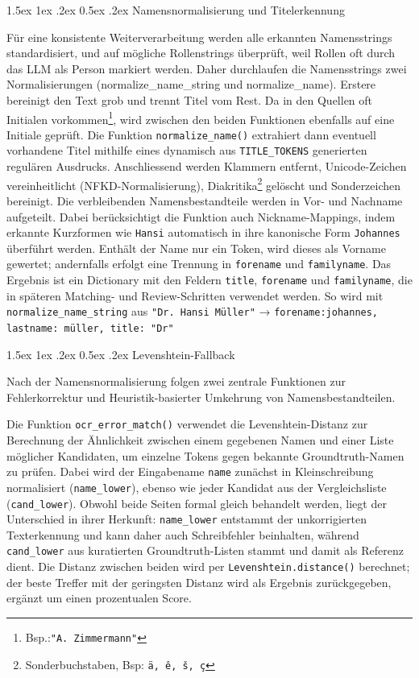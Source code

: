 \documentclass[12pt, a4paper, ngerman, bidi=default]{article}
\makeatletter
\newcommand{\code}[1]{\colorbox{VeryLightGray}{\texttt{#1}}} %
\let\oldparagraph\paragraph%
\renewcommand{\paragraph}{
    \@ifstar%
      \xxxParagraphStar%
      \xxxParagraphNoStar%
 }
\newcommand{\xxxParagraphStar}[1]{\oldparagraph*{#1}\mbox{}}
\newcommand{\xxxParagraphNoStar}[1]{\oldparagraph{#1}\mbox{}}
\renewcommand\paragraph{\@startsection{paragraph}{4}{0em}%
  {1.5ex \@plus1ex \@minus.2ex}%
  {0.5ex \@plus.2ex}%
  {\normalfont\normalsize\bfseries\itshape}}
\makeatother
\begin{document}
\paragraph{Namensnormalisierung und Titelerkennung}\label{paragraph:Pers_match/Normalisierung}

Für eine konsistente Weiterverarbeitung werden alle erkannten Namensstrings standardisiert, und auf mögliche Rollenstrings überprüft, weil Rollen oft durch das LLM als Person markiert werden. Daher durchlaufen die Namensstrings zwei Normalisierungen (normalize\_name\_string und normalize\_name). Erstere bereinigt den Text grob und trennt Titel vom Rest. Da in den Quellen oft Initialen vorkommen\footnote{Bsp.:\texttt{"A. Zimmermann"}}, wird zwischen den beiden Funktionen ebenfalls auf eine Initiale geprüft.
Die Funktion \code{normalize\_name()} extrahiert dann eventuell vorhandene Titel mithilfe eines dynamisch aus \code{TITLE\_TOKENS} generierten regulären Ausdrucks. Anschliessend werden Klammern entfernt, Unicode-Zeichen vereinheitlicht (NFKD-Normalisierung), Diakritika\footnote{Sonderbuchstaben, Bsp: \texttt{ä, ê, š, ç}} gelöscht und Sonderzeichen bereinigt.
Die verbleibenden Namensbestandteile werden in Vor- und Nachname aufgeteilt. Dabei berücksichtigt die Funktion auch Nickname-Mappings, indem erkannte Kurzformen wie \texttt{Hansi} automatisch in ihre kanonische Form \texttt{Johannes} überführt werden. Enthält der Name nur ein Token, wird dieses als Vorname gewertet; andernfalls erfolgt eine Trennung in \code{forename} und \code{familyname}. Das Ergebnis ist ein Dictionary mit den Feldern \code{title}, \code{forename} und \code{familyname}, die in späteren Matching- und Review-Schritten verwendet werden. So wird mit \code{normalize\_name\_string} aus \texttt{"Dr. Hansi Müller"}
→ \texttt{\code{forename}:johannes, \code{lastname}: müller, \code{title}: "Dr"}

\paragraph{Levenshtein-Fallback}\label{paragraph:Pers_match/Fallback}

Nach der Namensnormalisierung folgen zwei zentrale Funktionen zur Fehlerkorrektur und Heuristik-basierter Umkehrung von Namensbestandteilen.

Die Funktion \code{ocr\_error\_match()} verwendet die Levenshtein-Distanz zur Berechnung der Ähnlichkeit zwischen einem gegebenen Namen und einer Liste möglicher Kandidaten, um einzelne Tokens gegen bekannte Groundtruth-Namen zu prüfen. Dabei wird der Eingabename \code{name} zunächst in Kleinschreibung normalisiert (\code{name\_lower}), ebenso wie jeder Kandidat aus der Vergleichsliste (\code{cand\_lower}).
Obwohl beide Seiten formal gleich behandelt werden, liegt der Unterschied in ihrer Herkunft: \code{name\_lower} entstammt der unkorrigierten Texterkennung und kann daher auch Schreibfehler beinhalten, während \code{cand\_lower} aus kuratierten Groundtruth-Listen stammt und damit als Referenz dient.
Die Distanz zwischen beiden wird per \code{Levenshtein.distance()} berechnet; der beste Treffer mit der geringsten Distanz wird als Ergebnis zurückgegeben, ergänzt um einen prozentualen Score.
\end{document}
